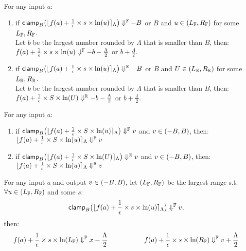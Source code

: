 \documentclass[a4paper,11pt]{article}
\begin{document}
\begin{lem}[clampR]
\label{lem:clampr}
For any input $a$:
\begin{enumerate}
\item 
if 
$\mathsf{clamp}_B \big(
	\lfloor f(a) + \frac{1}{\epsilon} \times s \times \ln (u) \rceil_{\Lambda}
	\big)
	\Downarrow^{\mathbb{F}} -B$ or $B$ and $u \in (L_{\mathbb{F}}, R_{\mathbb{F}})$ for some $L_{\mathbb{F}}, R_{\mathbb{F}}$.
	\\
	 Let $b$ be the largest number rounded by $\Lambda$ that is smaller than $B$, 
	 then:
	 \\
	$f(a) + \frac{1}{\epsilon} \times s \times \ln (u) \Downarrow^{\mathbb{F}} -b - \frac{\Lambda}{2}$ or $b + \frac{\Lambda}{2}$.
%
\item
if
$\mathsf{clamp}_B \big(
	\lfloor f(a) + \frac{1}{\epsilon} \times s \times \ln (u) \rceil_{\Lambda}
	\big)
	\Downarrow^{\mathbb{R}} -B$ or $B$ and $U \in (L_{\mathbb{R}}, R_{\mathbb{R}})$ for some $L_{\mathbb{R}}, R_{\mathbb{R}}$.
	\\
	 Let $b$ be the largest number rounded by $\Lambda$ that is smaller than $B$, 
	 then:
	 \\
	$f(a) + \frac{1}{\epsilon} \times S \times \ln (U) \Downarrow^{\mathbb{R}} -b - \frac{\Lambda}{2}$ or $b + \frac{\Lambda}{2}$.
\end{enumerate}
\end{lem}


\begin{lem}[clampId]
\label{lem:clampid}
For any input $a$:
\begin{enumerate}
\item 
if 
$\mathsf{clamp}_B \big(
	\lfloor f(a) + \frac{1}{\epsilon} \times S \times \ln (u) \rceil_{\Lambda}
	\big)
	\Downarrow^{\mathbb{F}} v$ and $v \in (-B, B)$, then:
	$\lfloor f(a) + \frac{1}{\epsilon} \times S \times \ln (u) \rceil_{\Lambda}
	\Downarrow^{\mathbb{F}} v$
%
\item
if
$\mathsf{clamp}_B \big(
	\lfloor f(a) + \frac{1}{\epsilon} \times S \times \ln (U) \rceil_{\Lambda}
	\big)
	\Downarrow^{\mathbb{R}} v$ and $v \in (-B, B)$, then:
	$\lfloor f(a) + \frac{1}{\epsilon} \times S \times \ln (u) \rceil_{\Lambda}
	\Downarrow^{\mathbb{R}} v$
\end{enumerate}
\end{lem}


\begin{lem}[RoundRL]
\label{lem:roundrl}
For any input $a$ and output $v \in (-B, B)$,
let $(L_{\mathbb{F}}, R_{\mathbb{F}})$ be the largest range s.t. 
$\forall u \in (L_{\mathbb{F}}, R_{\mathbb{F}})$ and some $s$:
%
$$
\mathsf{clamp}_B \big(
	\lfloor f(a) + \frac{1}{\epsilon} \times s \times \ln (u) \rceil_{\Lambda}
	\big)
	\Downarrow^{\mathbb{F}} v,$$
then:
$$
f(a) + \frac{1}{\epsilon} \times s \times 
\ln (L_{\mathbb{F}})
\Downarrow^{\mathbb{F}} x - \frac{\Lambda}{2}
~~~~~~~~~~~~~~~~
f(a) + \frac{1}{\epsilon} \times s \times 
\ln (R_{\mathbb{F}})
\Downarrow^{\mathbb{F}} v + \frac{\Lambda}{2}
$$
\end{lem}
\end{document}
